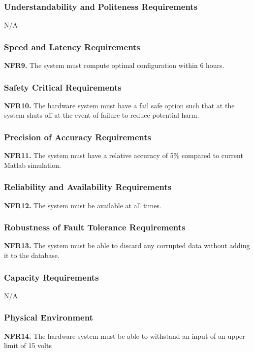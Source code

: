 \documentclass[12pt, titlepage]{article}
\begin{document}
\subsubsection{Understandability and Politeness Requirements}
N/A

\subsubsection{Speed and Latency Requirements}
\textbf{NFR9.} The system must compute optimal configuration within 6 hours.

\subsubsection{Safety Critical Requirements}
\textbf{NFR10.} The hardware system must have a fail safe option such that at the system shuts off at the event of failure to reduce potential harm.

\subsubsection{Precision of Accuracy Requirements}
\textbf{NFR11.} The system must have a relative accuracy of 5\% compared to current Matlab simulation.

\subsubsection{Reliability and Availability Requirements}
\textbf{NFR12.} The system must be available at all times.\\

\subsubsection{Robustness of Fault Tolerance Requirements}
\textbf{NFR13.} The system must be able to discard any corrupted data without adding it to the database.\\

\subsubsection{Capacity Requirements}
N/A
\subsubsection{Physical Environment}
\textbf{NFR14.} The hardware system must be able to withstand an input of an upper limit of 15 volts\\
\end{document}
